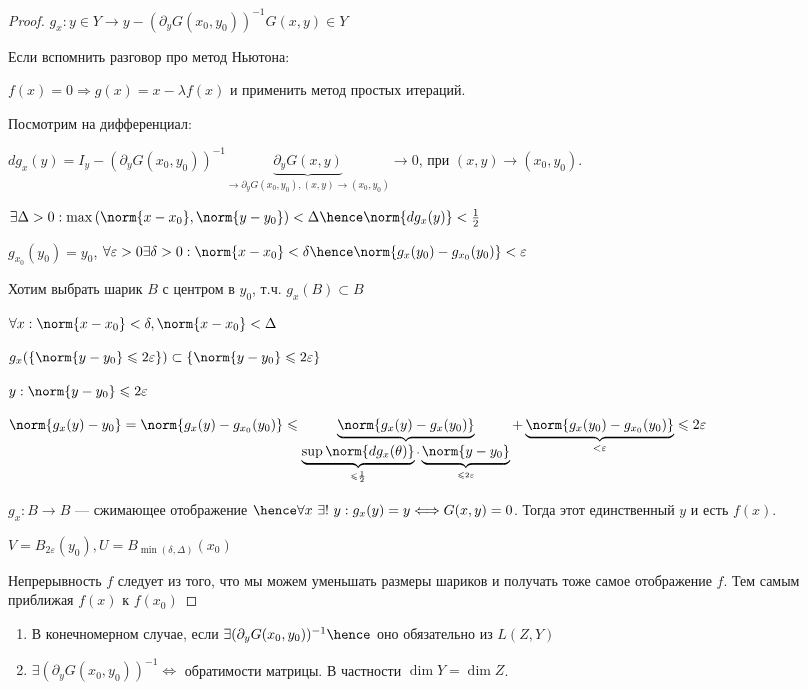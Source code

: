 \begin{proof}
    $g_x : y \in Y \to y - (\partial_y G(x_0, y_0)) ^ {-1} G(x, y) \in Y$

    Если вспомнить разговор про метод Ньютона:

    $f(x) = 0 \Rightarrow g(x) = x - \lambda f(x)$ и применить метод простых итераций.

    Посмотрим на дифференциал:

    $dg_x(y) = I_y - (\partial_y G(x_0, y_0)) ^ {-1} \underbrace{\partial_y G(x, y)}_ {\to \partial_y G(x_0, y_0), (x, y) \to (x_0, y_0) } \to 0$, при $(x, y) \to (x_0, y_0)$.

    $\exists \Delta > 0 : \max{(\norm{x - x_0} , \norm{y - y_0})} < \Delta \hence \norm{dg_x(y)} < \frac{1}{2}$

    $g_{x_0}(y_0) = y_0$, $\forall \varepsilon > 0 \exists \delta > 0 : \norm{x - x_0} < \delta \hence \norm{g_x(y_0) - g_{x_0}(y_0)} < \varepsilon$

    Хотим выбрать шарик $B$ с центром в $y_0$, т.ч. $g_x(B) \subset B$

    $\forall x : \norm{x - x_0} < \delta, \norm{x - x_0} < \Delta$

    $ g_x(\{ \norm{y - y_0} \leqslant 2 \varepsilon \}) \subset \{ \norm{y - y_0} \leqslant 2 \varepsilon \}$

    $y : \norm{y - y_0} \leqslant 2 \varepsilon$

    $\norm{g_x(y) - y_0} = \norm{g_x(y) - g_{x_0}(y_0)} \leqslant \underbrace{\norm{g_x(y) - g_x(y_0)}}_{\underbrace{\sup \norm{dg_x(\theta)}}_{\leqslant \frac{1}{2}} \cdot \underbrace{\norm{y - y_0}}_{\leqslant 2 \varepsilon}} + \underbrace{\norm{g_x(y_0) - g_{x_0}(y_0)}}_{< \varepsilon} \leqslant 2 \varepsilon$

    $g_x : B \to B$ --- сжимающее отображение $\hence \forall x\,\, \exists! \,\, y : g_x(y) = y \Longleftrightarrow G(x, y) = 0$. Тогда этот единственный $y$ и есть $f(x)$.

    $V = B_{2\varepsilon}(y_0), U = B_{\min(\delta, \Delta)}(x_0)$

    Непрерывность $f$ следует из того, что мы можем уменьшать размеры шариков и получать тоже самое отображение $f$. Тем самым приближая $f(x)$ к $f(x_0)$
\end{proof}

\begin{remark}
\quad
    \begin{enumerate}
        \item В конечномерном случае, если $\exists (\partial_y G(x_0, y_0))^ {-1} \hence $ оно обязательно из $L(Z, Y)$
        \item $\exists (\partial_y G(x_0, y_0))^{-1} \Longleftrightarrow $ обратимости матрицы. В частности $\dim Y = \dim Z$.
    \end{enumerate}
\end{remark}
